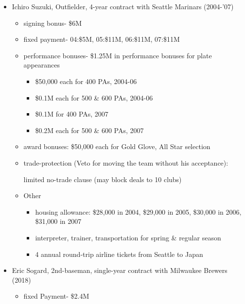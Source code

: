 \documentclass[dvipdfmx, 12pt]{article}
\begin{document}
\begin{table}
  \centering
  \small
  \caption{Descriptions of the Contract of the Specific Players}
  \label{Incentive_Contracts}
  \begin{itemize}
    \item Ichiro Suzuki, Outfielder, 4-year contract with Seattle Marinars (2004-'07)
    \begin{itemize}
      \item signing bonus- \$6M

      \item fixed payment- 04:\$5M, 05:\$11M, 06:\$11M, 07:\$11M

      \item performance bonuses- \$1.25M in performance bonuses for plate appearances

      \begin{itemize}
        \item \$50,000 each for 400 PAs, 2004-06

        \item \$0.1M each for 500 \& 600 PAs, 2004-06

        \item \$0.1M for 400 PAs, 2007

        \item \$0.2M each for 500 \& 600 PAs, 2007
      \end{itemize}

      \item award bonuses: \$50,000 each for Gold Glove, All Star selection

      \item trade-protection (Veto for moving the team without his acceptance):

      limited no-trade clause (may block deals to 10 clubs)

      \item Other

      \begin{itemize}
        \item housing allowance: \$28,000 in 2004, \$29,000 in 2005, \$30,000 in 2006, \$31,000 in 2007

        \item interpreter, trainer, transportation for spring \& regular season

        \item 4 annual round-trip airline tickets from Seattle to Japan
      \end{itemize}
    \end{itemize}
  \end{itemize}
  \begin{itemize}
    \item Eric Sogard, 2nd-baseman, single-year contract with Milwaukee Brewers (2018)
    \begin{itemize}
      \item fixed Payment- \$2.4M


\end{itemize}
\end{itemize}
\end{table}
\end{document}
